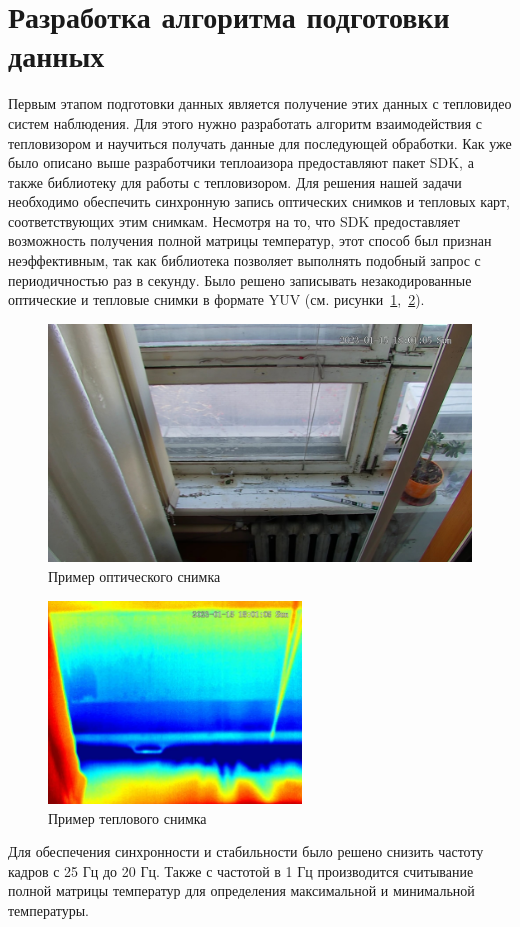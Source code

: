 \documentclass[14pt, a4paper]{extreport}
\begin{document}
	\section[Разработка алгоритма подготовки данных]{Разработка алгоритма подготовки данных}
	
	Первым этапом подготовки данных является получение этих данных с тепловидео систем наблюдения. Для этого нужно разработать алгоритм взаимодействия с тепловизором и научиться получать данные для последующей обработки. Как уже было описано выше разработчики теплоаизора предоставляют пакет SDK, а также библиотеку для работы с тепловизором.
	Для решения нашей задачи необходимо обеспечить синхронную запись оптических снимков и тепловых карт, соответствующих этим снимкам. Несмотря на то, что SDK предоставляет возможность получения полной матрицы температур, этот способ был признан неэффективным, так как библиотека позволяет выполнять подобный запрос с периодичностью раз в секунду. Было решено записывать незакодированные оптические и тепловые снимки в формате YUV (см. рисунки~\ref{fig:opt_example},~\ref{fig:tep_example}). 
	\begin{figure}[h!]
		\centering
		\includegraphics[width = 13cm]{image/chapter_2/opt_example}	
		\caption{Пример оптического снимка}
		\label{fig:opt_example}
	\end{figure}
	
	\begin{figure}[h!]
		\centering
		\includegraphics[width = 0.6\textwidth]{image/chapter_2/tep_example}	
		\caption{Пример теплового снимка}
		\label{fig:tep_example}
	\end{figure}
	Для обеспечения синхронности и стабильности было решено снизить частоту кадров с 25 Гц до 20 Гц. Также с частотой в 1 Гц производится считывание полной матрицы температур для определения максимальной и минимальной температуры. 
	
\end{document}
